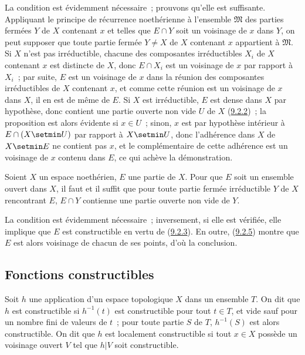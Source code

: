 La condition est évidemment nécessaire~; prouvons qu'elle est suffisante.
Appliquant le principe de récurrence noethérienne à l'ensemble $\mathfrak{M}$
des parties fermées $Y$ de $X$ contenant $x$ et telles que $E\cap Y$ soit un
voisinage de $x$ dans $Y$, on peut supposer que toute partie fermée $Y\ne X$
de $X$ contenant $x$ appartient à $\mathfrak{M}$. Si $X$ n'est pas
irréductible, chacune des composantes irréductibles $X_i$ de $X$ contenant
$x$ est distincte de $X$, donc $E\cap X_i$ est un voisinage de $x$ par
rapport à $X_i$~; par suite, $E$ est un voisinage de $x$ dans la réunion des
composantes irréductibles de $X$ contenant $x$, et comme cette réunion est un
voisinage de $x$ dans $X$, il en est de même de $E$. Si $X$ est
irréductible, $E$ est dense dans $X$ par hypothèse, donc contient une partie
ouverte non vide $U$ de $X$ (\hyperref[0.9.2.2-fr]{9.2.2})~; la proposition
est alors évidente si $x\in U$~; sinon, $x$ est par hypothèse intérieur à
$E\cap(X\setmin U)$ par rapport à $X\setmin U$, donc l'adhérence dans
$X$ de $X\setmin E$ ne contient pas $x$, et le complémentaire de cette
adhérence est un voisinage de $x$ contenu dans $E$, ce qui achève la
démonstration.

\begin{corollary}[9.2.6]
\label{0.9.2.6-fr}
Soient $X$ un espace noethérien, $E$ une partie de $X$. Pour que $E$ soit un
ensemble ouvert dans $X$, il faut et il suffit que pour toute partie fermée
irréductible $Y$ de $X$ rencontrant $E$, $E\cap Y$ contienne une partie
ouverte non vide de $Y$.
\end{corollary}

La condition est évidemment nécessaire~; inversement, si elle est vérifiée,
elle implique que $E$ est constructible en vertu de
(\hyperref[0.9.2.3-fr]{9.2.3}). En outre,
(\hyperref[0.9.2.5-fr]{9.2.5}) montre que $E$ est alors voisinage de chacun
de ses points, d'où la conclusion.

\subsection{Fonctions constructibles}
\label{subsection:0.9.3-fr}

\begin{definition}[9.3.1]
\label{0.9.3.1-fr}
Soit $h$ une application d'un espace topologique $X$ dans un ensemble $T$.
On dit que $h$ est constructible si $h^{-1}(t)$ est constructible pour
tout $t\in T$, et vide sauf pour un nombre fini de valeurs de $t$~; pour
toute partie $S$ de $T$, $h^{-1}(S)$ est alors constructible. On dit que $h$
est localement constructible si tout $x\in X$ possède un voisinage
ouvert $V$ tel que $h|V$ soit constructible.
\end{definition}

